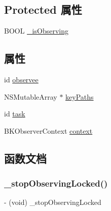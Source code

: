 \subsection*{Protected 属性}
\begin{DoxyCompactItemize}
\item 
B\+O\+OL \hyperlink{interface___b_k_observer_a4b28deded32911b3dc65c0fc0c523c2f}{\+\_\+is\+Observing}
\end{DoxyCompactItemize}
\subsection*{属性}
\begin{DoxyCompactItemize}
\item 
id \hyperlink{interface___b_k_observer_aa0083a9731dda0eaa1fc8e5642099d1a}{observee}
\item 
N\+S\+Mutable\+Array $\ast$ \hyperlink{interface___b_k_observer_abfe1e7cafd49ba0cbe1a3dc797b3745f}{key\+Paths}
\item 
id \hyperlink{interface___b_k_observer_a9317ff3a2e8b4706550cab9426c45a04}{task}
\item 
B\+K\+Observer\+Context \hyperlink{interface___b_k_observer_af86c9c7c4cd783d3e3c58324c5459671}{context}
\end{DoxyCompactItemize}


\subsection{函数文档}
\mbox{\label{interface___b_k_observer_a549c8dec9fe77025cfef4201437f1e7c}} 
\subsubsection{\texorpdfstring{\+\_\+stop\+Observing\+Locked()}{\_stopObservingLocked()}}
{\footnotesize\ttfamily -\/ (void) \+\_\+stop\+Observing\+Locked \begin{DoxyParamCaption}{ }\end{DoxyParamCaption}\hspace{0.3cm}{\ttfamily [implementation]}}

\mbox{\label{interface___b_k_observer_a6315f95e1f354c2c70058ee926042538}} 
